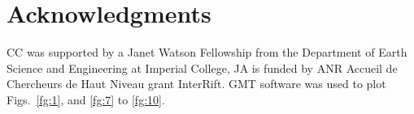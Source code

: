 \documentclass[a4paper,10pt,twocolumn]{paper}
\begin{document}

\section*{Acknowledgments}
CC was supported by a Janet Watson Fellowship from the Department of Earth Science and Engineering at Imperial College, JA is funded by ANR Accueil de Chercheurs de Haut Niveau grant InterRift. GMT \citep{wessel-1995} software was used to plot Figs.~\ref{fg:1}, and \ref{fg:7} to \ref{fg:10}.

%
\end{document}
